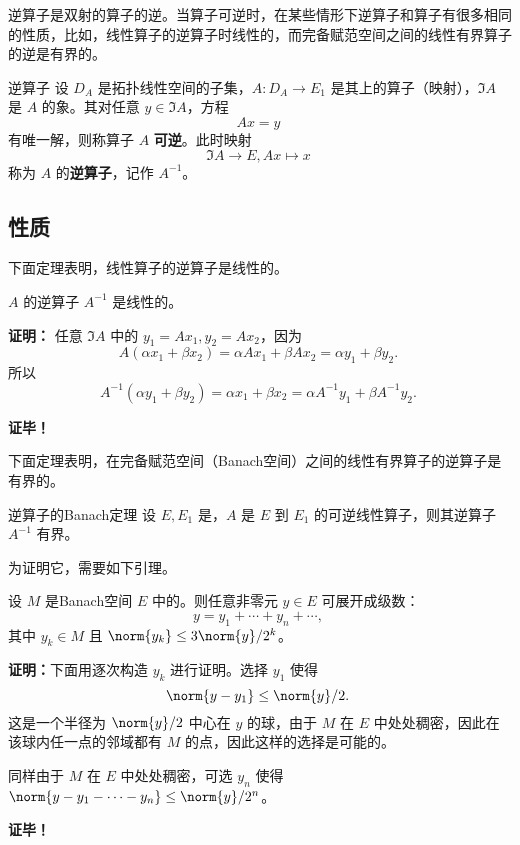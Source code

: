 

逆算子是双射的算子的逆。当算子可逆时，在某些情形下逆算子和算子有很多相同的性质，比如，线性算子的逆算子时线性的，而完备赋范空间之间的线性有界算子的逆是有界的。


\begin{definition}{逆算子}
设 $D_A$ 是拓扑线性空间的子集，$A:D_A\rightarrow E_1$ 是其上的算子（映射），$\Im A$ 是 $A$ 的象。其对任意 $y\in\Im A$，方程
\begin{equation}
Ax=y~
\end{equation}
 有唯一解，则称算子 $A$ \textbf{可逆}。此时映射
 \begin{equation}
 \Im A\rightarrow E,Ax\mapsto x~  
 \end{equation}
 称为 $A$ 的\textbf{逆算子}，记作 $A^{-1}$。

\end{definition}

\subsection{性质}
下面定理表明，线性算子的逆算子是线性的。

\begin{theorem}{}
 $A$ 的逆算子 $A^{-1}$ 是线性的。
\end{theorem}

\textbf{证明：}
任意 $\Im A$ 中的 $y_1=A x_1,y_2=Ax_2$，因为
\begin{equation}
A(\alpha x_1+\beta x_2)=\alpha Ax_1+\beta Ax_2=\alpha y_1+\beta y_2.~
\end{equation}
所以
\begin{equation}
A^{-1}(\alpha y_1+\beta y_2)=\alpha x_1+\beta x_2=\alpha A^{-1}y_1+\beta A^{-1}y_2.~
\end{equation}


\textbf{证毕！}

下面定理表明，在完备赋范空间（Banach空间）之间的线性有界算子的逆算子是有界的。

\begin{theorem}{逆算子的Banach定理}
设 $E,E_1$ 是，$A$ 是 $E$ 到 $E_1$ 的可逆线性算子，则其逆算子 $A^{-1}$ 有界。
\end{theorem}

为证明它，需要如下引理。
\begin{lemma}{}
设 $M$ 是Banach空间 $E$ 中的。则任意非零元 $y\in E$ 可展开成级数：
\begin{equation}
y=y_1+\cdots+y_n+\cdots,~
\end{equation}
其中 $y_k\in M$ 且 $\norm{y_k}\leq 3\norm{y}/2^k$。
\end{lemma}
\textbf{证明：}下面用逐次构造 $y_k$ 进行证明。选择 $y_1$ 使得
\begin{equation}
\norm{y-y_1}\leq\norm{y}/2.~
\end{equation}
这是一个半径为 $\norm{y}/2$ 中心在 $y$ 的球，由于 $M$ 在 $E$ 中处处稠密，因此在该球内任一点的邻域都有 $M$ 的点，因此这样的选择是可能的。

同样由于 $M$ 在 $E$ 中处处稠密，可选 $y_n$ 使得 $\norm{y-y_1-\cdots-y_n}\leq\norm{y}/2^n$。


\textbf{证毕！}



